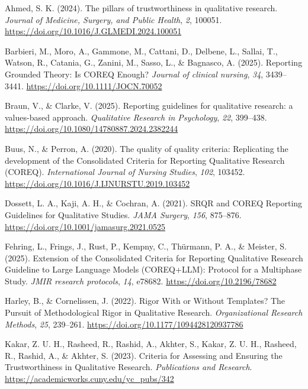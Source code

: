 \documentclass[
  indonesian,
  letterpaper,
  DIV=11,
  numbers=noendperiod]{scrreprt}
\newlength{\cslhangindent}
\newenvironment{CSLReferences}[2] %
 {\begin{list}{}{%
  \setlength{\itemindent}{0pt}
  \setlength{\leftmargin}{0pt}
  \setlength{\parsep}{0pt}
  \ifodd #1
   \setlength{\leftmargin}{\cslhangindent}
   \setlength{\itemindent}{-1\cslhangindent}
  \fi
  \setlength{\itemsep}{#2\baselineskip}}}
 {\end{list}}
\begin{document}
\label{refs--21}
\begin{CSLReferences}{1}{0}
Ahmed, S. K. (2024). The pillars of trustworthiness in qualitative
research. \emph{Journal of Medicine, Surgery, and Public Health},
\emph{2}, 100051. \url{https://doi.org/10.1016/J.GLMEDI.2024.100051}

Barbieri, M., Moro, A., Gammone, M., Cattani, D., Delbene, L., Sallai,
T., Watson, R., Catania, G., Zanini, M., Sasso, L., \& Bagnasco, A.
(2025). Reporting Grounded Theory: Is COREQ Enough? \emph{Journal of
clinical nursing}, \emph{34}, 3439--3441.
\url{https://doi.org/10.1111/JOCN.70052}

Braun, V., \& Clarke, V. (2025). Reporting guidelines for qualitative
research: a values-based approach. \emph{Qualitative Research in
Psychology}, \emph{22}, 399--438.
\url{https://doi.org/10.1080/14780887.2024.2382244}

Buus, N., \& Perron, A. (2020). The quality of quality criteria:
Replicating the development of the Consolidated Criteria for Reporting
Qualitative Research (COREQ). \emph{International Journal of Nursing
Studies}, \emph{102}, 103452.
\url{https://doi.org/10.1016/J.IJNURSTU.2019.103452}

Dossett, L. A., Kaji, A. H., \& Cochran, A. (2021). SRQR and COREQ
Reporting Guidelines for Qualitative Studies. \emph{JAMA Surgery},
\emph{156}, 875--876. \url{https://doi.org/10.1001/jamasurg.2021.0525}

Fehring, L., Frings, J., Rust, P., Kempny, C., Thürmann, P. A., \&
Meister, S. (2025). Extension of the Consolidated Criteria for Reporting
Qualitative Research Guideline to Large Language Models (COREQ+LLM):
Protocol for a Multiphase Study. \emph{JMIR research protocols},
\emph{14}, e78682. \url{https://doi.org/10.2196/78682}

Harley, B., \& Cornelissen, J. (2022). Rigor With or Without Templates?
The Pursuit of Methodological Rigor in Qualitative Research.
\emph{Organizational Research Methods}, \emph{25}, 239--261.
\url{https://doi.org/10.1177/1094428120937786}

Kakar, Z. U. H., Rasheed, R., Rashid, A., Akhter, S., Kakar, Z. U. H.,
Rasheed, R., Rashid, A., \& Akhter, S. (2023). Criteria for Assessing
and Ensuring the Trustworthiness in Qualitative Research.
\emph{Publications and Research}.
\url{https://academicworks.cuny.edu/yc_pubs/342}


\end{CSLReferences}
\end{document}
